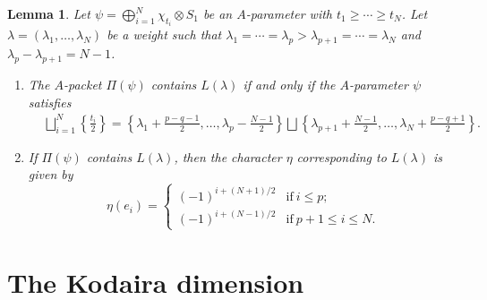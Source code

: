 \documentclass[11pt]{amsart}
\theoremstyle{plain}
\newtheorem{lem}[thm]{Lemma}
\theoremstyle{definition}
\numberwithin{equation}{section}
\begin{document}
\begin{lem}\label{A_packet_hol_LDS}
    Let $\psi = \bigoplus_{i=1}^N \chi_{t_i} \otimes S_{1}$ be an $A$-parameter with $t_1\geq \cdots \geq t_N$.
    Let $\lambda = (\lambda_1, \ldots,\lambda_{N})$ be a weight such that $\lambda_1 = \cdots = \lambda_p > \lambda_{p+1} = \cdots = \lambda_{N}$ and $\lambda_p - \lambda_{p+1} = N-1$.
    \begin{enumerate}
        \item The $A$-packet $\Pi(\psi)$ contains $L(\lambda)$ if and only if the $A$-parameter $\psi$ satisfies
            \begin{align*}
        &\bigsqcup_{i=1}^{N}\left\{\frac{t_i}{2}\right\} = \left\{\lambda_1 + \frac{p-q-1}{2}, \ldots, \lambda_{p} - \frac{N-1}{2}\right\} \bigsqcup
        \left\{\lambda_{p+1}+\frac{N-1}{2}, \ldots,\lambda_{N}+\frac{p-q+1}{2}
        \right\}.
        \end{align*}
        \item If $\Pi(\psi)$ contains $L(\lambda)$, then the character $\eta$ corresponding to $L(\lambda)$ is given by 
        \[
        \eta(e_i) = 
        \begin{cases}
            (-1)^{i + (N+1)/2} & \text{if}\ i \leq p;\\
            (-1)^{i+ (N-1)/2} & \text{if}\ p+1 \leq i \leq N.
        \end{cases}
        \]
    \end{enumerate}
\end{lem}





\section{The Kodaira dimension}
\label{sec:The Kodaira dimension}
\end{document}
